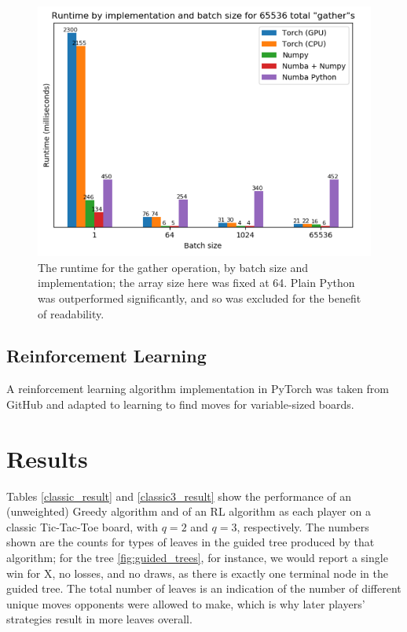 \documentclass[12pt,a4paper]{article}
\begin{document}
\begin{figure}[!h]
	\centering
	\includegraphics[scale=.7]{./img/batched_full.png}
	\caption{The runtime for the gather operation, by batch size and implementation; the array size here was fixed at 64. Plain Python was outperformed significantly, and so was excluded for the benefit of readability.} \label{fig:batched}
\end{figure}

\subsection{Reinforcement Learning}

A reinforcement learning algorithm implementation in PyTorch was taken from GitHub and adapted to learning to find moves for variable-sized boards. 

\section{Results}

Tables \ref{classic_result} and \ref{classic3_result} show the performance of an (unweighted) Greedy algorithm and of an RL algorithm as each player on a classic Tic-Tac-Toe board, with $q=2$ and $q=3$, respectively. The numbers shown are the counts for types of leaves in the guided tree produced by that algorithm; for the tree \ref{fig:guided_trees}, for instance, we would report a single win for X, no losses, and no draws, as there is exactly one terminal node in the guided tree. The total number of leaves is an indication of the number of different unique moves opponents were allowed to make, which is why later players' strategies result in more leaves overall. 
\end{document}
